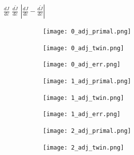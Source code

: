 \documentclass{paper1}
\begin{document}
\begin{figure}
    \centering
    $\frac{dJ}{dc}$ \hspace{4.3cm} $\frac{d\tilde{J}}{dc}$  \hspace{4cm} $\left|\frac{dJ}{dc} - \frac{d\tilde{J}}{dc}\right|$\\
    \begin{subfigure}[b]{.95\textwidth}
          \centering
          \begin{subfigure}[b]{0.32\textwidth}
                  \centering
                  \texttt{[image: 0\_adj\_primal.png]}
          \end{subfigure}%
          \begin{subfigure}[b]{0.32\textwidth}
                  \centering
                  \texttt{[image: 0\_adj\_twin.png]}
          \end{subfigure}
          \begin{subfigure}[b]{0.32\textwidth}
                  \centering
                  \texttt{[image: 0\_adj\_err.png]}
          \end{subfigure}%
    \end{subfigure}
    \begin{subfigure}[b]{.95\textwidth}
          \centering
          \begin{subfigure}[b]{0.32\textwidth}
                  \centering
                  \texttt{[image: 1\_adj\_primal.png]}
          \end{subfigure}%
          \begin{subfigure}[b]{0.32\textwidth}
                  \centering
                  \texttt{[image: 1\_adj\_twin.png]}
          \end{subfigure}
          \begin{subfigure}[b]{0.32\textwidth}
                  \centering
                  \texttt{[image: 1\_adj\_err.png]}
          \end{subfigure}
    \end{subfigure}
    \begin{subfigure}[b]{.95\textwidth}
          \centering
          \begin{subfigure}[b]{0.32\textwidth}
                  \centering
                  \texttt{[image: 2\_adj\_primal.png]}
          \end{subfigure}%
          \begin{subfigure}[b]{0.32\textwidth}
                  \centering
                  \texttt{[image: 2\_adj\_twin.png]}
          \end{subfigure}

\end{subfigure}
\end{figure}
\end{document}
